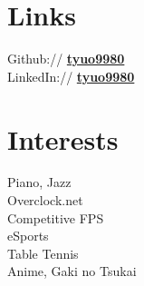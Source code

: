 \documentclass[]{peter_resume}
\begin{document}
\begin{minipage}[t]{0.22\textwidth}






\vspace{1.9cm}

\section{Links} 
Github:// \href{https://github.com/tyuo9980}{\bf tyuo9980} \\
LinkedIn://  \href{https://www.linkedin.com/in/tyuo9980}{\bf tyuo9980} \\
\sectionsep


\section{Interests} 
Piano, Jazz \\
Overclock.net \\
Competitive FPS \\
eSports \\
Table Tennis \\
Anime, Gaki no Tsukai \\
\sectionsep

\end{minipage} 
\end{document}
